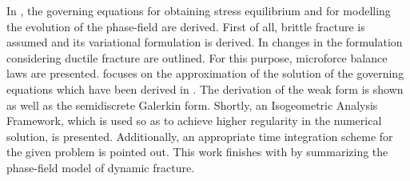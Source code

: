 In , the governing equations for obtaining stress equilibrium and for modelling the evolution of the phase-field are derived. First of all, brittle fracture is assumed and its variational formulation is derived. In  changes in the formulation considering ductile fracture are outlined. For this purpose, microforce balance laws are presented.   focuses on the approximation of the solution of the governing equations which have been derived in . The derivation of the weak form is shown as well as the semidiscrete Galerkin form. Shortly, an Isogeometric Analysis Framework, which is used so as to achieve higher regularity in the numerical solution, is presented. Additionally, an appropriate time integration scheme for the given problem is pointed out. This work finishes with  by summarizing the phase-field model of dynamic fracture.




